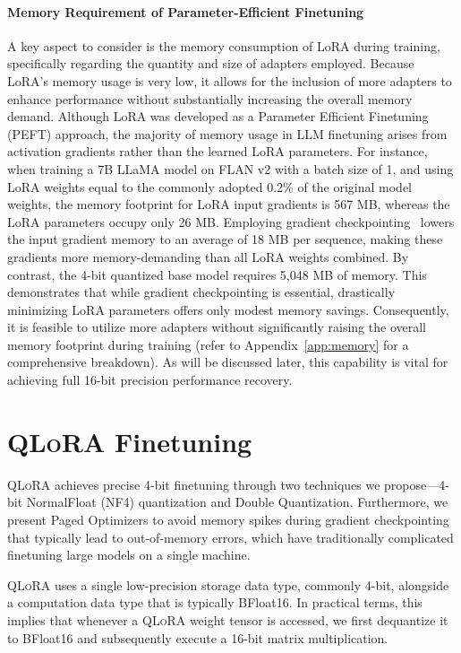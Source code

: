 \paragraph{Memory Requirement of Parameter-Efficient Finetuning} A key aspect to consider is the memory consumption of LoRA during training, specifically regarding the quantity and size of adapters employed. Because LoRA's memory usage is very low, it allows for the inclusion of more adapters to enhance performance without substantially increasing the overall memory demand. Although LoRA was developed as a Parameter Efficient Finetuning (PEFT) approach, the majority of memory usage in LLM finetuning arises from activation gradients rather than the learned LoRA parameters. For instance, when training a 7B LLaMA model on FLAN v2 with a batch size of 1, and using LoRA weights equal to the commonly adopted 0.2\% of the original model weights\citep{hu2021lora,liu2022few}, the memory footprint for LoRA input gradients is 567 MB, whereas the LoRA parameters occupy only 26 MB. Employing gradient checkpointing~\citep{chen2016training} lowers the input gradient memory to an average of 18 MB per sequence, making these gradients more memory-demanding than all LoRA weights combined. By contrast, the 4-bit quantized base model requires 5,048 MB of memory. This demonstrates that while gradient checkpointing is essential, drastically minimizing LoRA parameters offers only modest memory savings. Consequently, it is feasible to utilize more adapters without significantly raising the overall memory footprint during training (refer to Appendix~\ref{app:memory} for a comprehensive breakdown). As will be discussed later, this capability is vital for achieving full 16-bit precision performance recovery.

\section{\textsc{QLoRA} Finetuning}

\textsc{QLoRA} achieves precise 4-bit finetuning through two techniques we propose—4-bit NormalFloat (NF4) quantization and Double Quantization. Furthermore, we present Paged Optimizers to avoid memory spikes during gradient checkpointing that typically lead to out-of-memory errors, which have traditionally complicated finetuning large models on a single machine.

\textsc{QLoRA} uses a single low-precision storage data type, commonly 4-bit, alongside a computation data type that is typically BFloat16. In practical terms, this implies that whenever a \textsc{QLoRA} weight tensor is accessed, we first dequantize it to BFloat16 and subsequently execute a 16-bit matrix multiplication.

